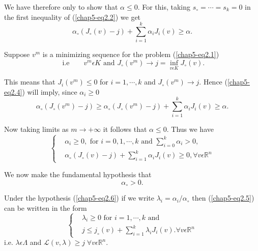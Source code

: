 We have therefore only to show that $\alpha \leq 0$. For this, taking $s_{\circ} = \cdots = s_{k} = 0$ in the first inequality of (\ref{chap5-eq2.2}) we get
\begin{equation*}
\alpha_{\circ} (J_{\circ}(v) - j) + \sum_{i=1}^{k} \alpha_{i} J_{i} (v) \geq \alpha.\tag{2.4}\label{chap5-eq2.4}
\end{equation*}

Suppose $v^{m}$ is a minimizing sequence for the problem (\ref{chap5-eq2.1})
$$
\text{ i.e}  \qquad v^{m} \epsilon K \text{ and } J_{\circ}(v^{m}) \to j = \inf_{v \epsilon K} J_{\circ} (v).
$$

This means that $J_{i} (v^{m}) \leq 0$ for $i = 1, \cdots, k$ and $J_{\circ}(v^{m}) \to j$. Hence (\ref{chap5-eq2.4}) will imply, since $\alpha_{i} \geq 0$
$$
\alpha_{\circ} (J_{\circ} (v^{m}) - j) \geq \alpha_{\circ} (J_{\circ}(v^{m})-j) + \sum_{i=1}^{k} \alpha_{i} J_{i} (v) \geq \alpha.
$$

Now taking limits as $m \to + \infty$ it follows that $\alpha \leq 0$. Thus we have
\begin{equation*}
\begin{cases}
& \alpha_{i} \geq 0, \text{ for } i = 0, 1, \cdots, k \text{ and } \sum_{i=0}^{k} \alpha_{i} > 0,\\
& \alpha_{\circ} (J_{\circ} (v) - j) + \sum_{i=1}^{k} \alpha_{i} J_{i}(v) \geq 0, \forall v \epsilon \mathbb{R}^{n}\tag{2.5}\label{chap5-eq2.5}
\end{cases}
\end{equation*}

We now make the fundamental hypothesis that
\begin{equation*}
\alpha_{\circ} > 0.\tag{2.6}\label{chap5-eq2.6}
\end{equation*}

Under the hypothesis (\ref{chap5-eq2.6}) if we write $\lambda_{i} = \alpha_{i} / \alpha_{\circ}$ then (\ref{chap5-eq2.5}) can be written in the form
\begin{equation*}
\begin{cases}
& \lambda_{i} \geq 0 \text{ for } i = 1, \cdots, k \text{ and }\\
& j \leq j_{\circ}(v) + \sum_{i=1}^{k} \lambda_{i} J_{i}(v). \forall v \epsilon \mathbb{R}^{n}\tag{2.7}\label{chap5-eq2.7}
\end{cases}
\end{equation*}\pageoriginale
i.e. $\lambda \epsilon \Lambda$ and $\mathscr{L} (v, \lambda) \geq j \; \forall v \epsilon \mathbb{R}^{n}$.


